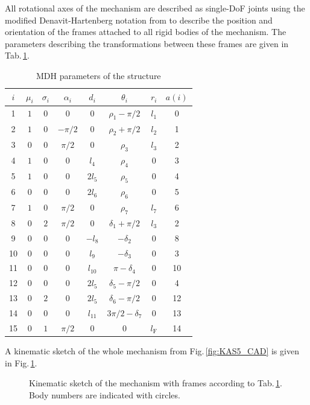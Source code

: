 \documentclass[letterpaper, 10 pt, conference]{ieeeconf}  %
\begin{document}
All rotational axes of the mechanism are described as single-DoF joints using the modified Denavit-Hartenberg notation from \cite{KhalilKle1986} to describe the position and orientation of the frames attached to all rigid bodies of the mechanism.
The parameters describing the transformations between these frames are given in Tab.\,\ref{tab:mdh_parameter}.
%
\begin{table}
    \begin{tabular}[t]{|c||c|c||c|c|c|c|c|}
        \hline
        $i$ & $\mu_i$ & $\sigma_i$ & $\alpha_i$ & $d_i$ & $\theta_i$ & $r_i$ & $a(i)$ \\
        \hline
        1 & $1$ & $0$ & $0$ & $0$ & $\rho_1-\pi/2$ & $l_1$ & 0 \\
        2 & $1$ & $0$ & $-\pi/2$ & $0$ & $\rho_2+\pi/2$ & $l_2$ & 1 \\
        3 & $0$ & $0$ & $\pi/2$ & $0$ & $\rho_3$ & $l_3$ & 2 \\
        4 & $1$ & $0$ & $0$ & $l_4$ & $\rho_4$ & $0$ & 3 \\
        5 & $1$ & $0$ & $0$ & $2l_{5}$ & $\rho_5$ & $0$ & 4 \\
        6 & $0$ & $0$ & $0$ & $2l_{6}$ & $\rho_6$ & $0$ & 5 \\
        7 & $1$ & $0$ & $\pi/2$ & $0$ & $\rho_7$ & $l_{7}$ & 6 \\
        8 & $0$ & $2$ & $\pi/2$ & $0$ & $\delta_{1}+\pi/2$ & $l_{3}$ & 2 \\
        9 & $0$ & $0$ & $0$ & $-l_{8}$ & $-\delta_{2}$ & $0$ & 8 \\
        10 & $0$ & $0$ & $0$ & $l_{9}$ & $-\delta_{3}$ & $0$ & 3 \\
        11 & $0$ & $0$ & $0$ & $l_{10}$ & $\pi-\delta_{4}$ & $0$ & 10 \\
        12 & $0$ & $0$ & $0$ & $2l_{5}$ & $\delta_{5}-\pi/2$ & $0$ & 4 \\
        13 & $0$ & $2$ & $0$ & $2l_{5}$ & $\delta_{6}-\pi/2$ & $0$ & 12 \\
        14 & $0$ & $0$ & $0$ & $l_{11}$ & $3\pi/2-\delta_{7}$ & $0$ & 13 \\
        15 & $0$ & $1$ & $\pi/2$ & $0$ & $0$ & $l_{\mathrm{F}}$ & 14 \\
        \hline
    \end{tabular}
    \caption{MDH parameters of the structure}
    \label{tab:mdh_parameter}
\end{table}
%
A kinematic sketch of the whole mechanism from Fig.\,\ref{fig:KAS5_CAD} is given in Fig.\,\ref{fig:KAS5_kinematik}.
%
\begin{figure}[tb]
    \small
    \begin{minipage}[t]{7.5cm}
        \vspace{0.2cm} %
        
    \end{minipage}
    
    \caption{Kinematic sketch of the mechanism with frames according to Tab.\,\ref{tab:mdh_parameter}. Body numbers are indicated with circles.}
    \label{fig:KAS5_kinematik}
\end{figure}
\end{document}
